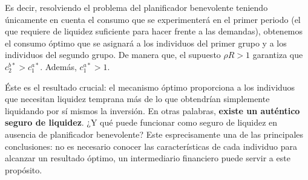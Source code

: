 \documentclass[10pt,a4paper]{article}
\begin{document}
Es decir, resolviendo el problema del planificador benevolente teniendo únicamente en cuenta el consumo que se experimenterá en el primer periodo (el que requiere de liquidez suficiente para hacer frente a las demandas), obtenemos el consumo óptimo que se asignará a los individuos del primer grupo y a los individuos del segundo grupo. De manera que, el supuesto $\rho R>1$ garantiza que $c_2^{b*}>c_1^{a*}$. Además, $c_1^{a*}>1$.

Éste es el resultado crucial: el mecanismo óptimo proporciona a los individuos que necesitan liquidez temprana más de lo que obtendrían simplemente liquidando por sí mismos la inversión. En otras palabras, \textbf{existe un auténtico seguro de liquidez}. ¿Y qué puede funcionar como seguro de liquidez en ausencia de planificador benevolente? Este esprecisamente una de las principales conclusiones: no es necesario conocer las características de cada individuo para alcanzar un resultado óptimo, un intermediario financiero puede servir a este propósito.
\end{document}
